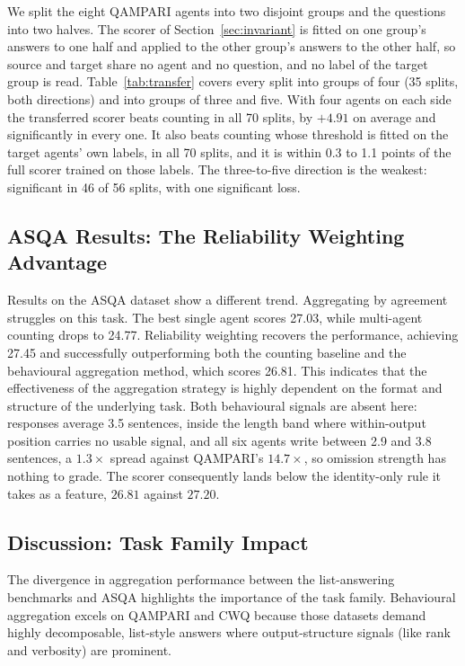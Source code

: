 \documentclass[11pt]{article}
\begin{document}
We split the eight QAMPARI agents into two disjoint groups and the questions into two halves. The scorer of Section~\ref{sec:invariant} is fitted on one group's answers to one half and applied to the other group's answers to the other half, so source and target share no agent and no question, and no label of the target group is read. Table~\ref{tab:transfer} covers every split into groups of four (35 splits, both directions) and into groups of three and five. With four agents on each side the transferred scorer beats counting in all 70 splits, by $+4.91$ on average and significantly in every one. It also beats counting whose threshold is fitted on the target agents' own labels, in all 70 splits, and it is within 0.3 to 1.1 points of the full scorer trained on those labels. The three-to-five direction is the weakest: significant in 46 of 56 splits, with one significant loss.
\subsection{ASQA Results: The Reliability Weighting Advantage}
\label{sec:rq3}


Results on the ASQA dataset show a different trend. Aggregating by agreement struggles on this task. The best single agent scores 27.03, while multi-agent counting drops to 24.77. Reliability weighting recovers the performance, achieving 27.45 and successfully outperforming both the counting baseline and the behavioural aggregation method, which scores 26.81. This indicates that the effectiveness of the aggregation strategy is highly dependent on the format and structure of the underlying task. Both behavioural signals are absent here: responses average 3.5 sentences, inside the length band where within-output position carries no usable signal, and all six agents write between 2.9 and 3.8 sentences, a $1.3\times$ spread against QAMPARI's $14.7\times$, so omission strength has nothing to grade. The scorer consequently lands below the identity-only rule it takes as a feature, $26.81$ against $27.20$.

\subsection{Discussion: Task Family Impact}

The divergence in aggregation performance between the list-answering benchmarks and ASQA highlights the importance of the task family. Behavioural aggregation excels on QAMPARI and CWQ because those datasets demand highly decomposable, list-style answers where output-structure signals (like rank and verbosity) are prominent.
\end{document}
